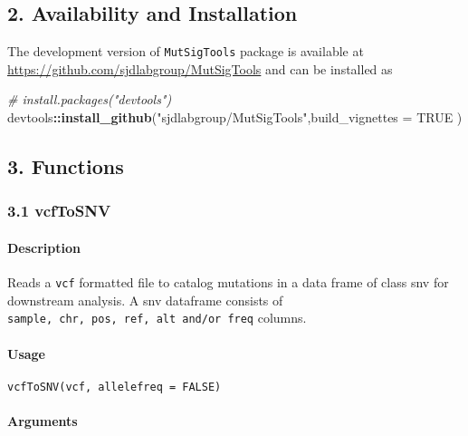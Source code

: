 \documentclass[]{article}
\newenvironment{Shaded}{\begin{snugshade}}{\end{snugshade}}
\newcommand{\KeywordTok}[1]{\textcolor[rgb]{0.13,0.29,0.53}{\textbf{#1}}}
\newcommand{\DataTypeTok}[1]{\textcolor[rgb]{0.13,0.29,0.53}{#1}}
\newcommand{\StringTok}[1]{\textcolor[rgb]{0.31,0.60,0.02}{#1}}
\newcommand{\CommentTok}[1]{\textcolor[rgb]{0.56,0.35,0.01}{\textit{#1}}}
\newcommand{\OtherTok}[1]{\textcolor[rgb]{0.56,0.35,0.01}{#1}}
\newcommand{\OperatorTok}[1]{\textcolor[rgb]{0.81,0.36,0.00}{\textbf{#1}}}
\newcommand{\NormalTok}[1]{#1}
\let\oldparagraph\paragraph
\renewcommand{\paragraph}[1]{\oldparagraph{#1}\mbox{}}
\begin{document}
\subsection{2. Availability and
Installation}\label{availability-and-installation}

The development version of \texttt{MutSigTools} package is available at
\url{https://github.com/sjdlabgroup/MutSigTools} and can be installed as

\begin{Shaded}
\begin{Highlighting}[]
\CommentTok{# install.packages("devtools")}
\NormalTok{devtools}\OperatorTok{::}\KeywordTok{install_github}\NormalTok{(}\StringTok{"sjdlabgroup/MutSigTools"}\NormalTok{,}\DataTypeTok{build_vignettes =} \OtherTok{TRUE}\NormalTok{ )}
\end{Highlighting}
\end{Shaded}

\subsection{3. Functions}\label{functions}

\hypertarget{vcfToSNV}{\subsubsection{3.1 vcfToSNV}\label{vcfToSNV}}

\paragraph{\texorpdfstring{\textbf{Description}}{Description}}\label{description}

Reads a \texttt{vcf} formatted file to catalog mutations in a data frame
of class snv for downstream analysis. A snv dataframe consists of
\texttt{sample,\ chr,\ pos,\ ref,\ alt\ and/or\ freq} columns.

\paragraph{\texorpdfstring{\textbf{Usage}}{Usage}}\label{usage}

\texttt{vcfToSNV(vcf,\ allelefreq\ =\ FALSE)}

\paragraph{\texorpdfstring{\textbf{Arguments
}}{Arguments }}\label{arguments}
\end{document}
